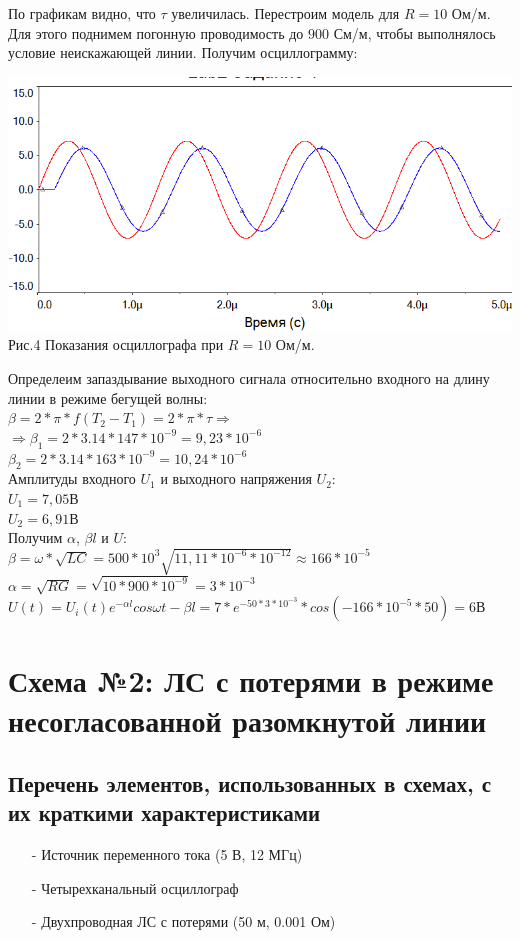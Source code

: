\documentclass[11pt]{article}
\begin{document}
По графикам видно, что $\tau$ увеличилась. Перестроим модель для $R = 10$ Ом/м.
Для этого поднимем погонную проводимость до $900$ См/м, чтобы выполнялось условие неискажающей линии.
Получим осциллограмму:
\begin{center}
\includegraphics[width=1\linewidth]{img/firstosc3.png}
    Рис.4 Показания осциллографа при  $R = 10$ Ом/м.
\end{center}

Определеим запаздывание выходного сигнала относительно входного на длину линии в режиме бегущей волны:\\
$\beta = 2*\pi*f(T_2-T_1) = 2*\pi*\tau \Rightarrow$ \\ 
$\Rightarrow \beta_1 = 2 * 3.14 * 147 * 10^{-9} = 9,23 * 10^{-6}$\\ 
$\beta_2 = 2 * 3.14 * 163 * 10^{-9} = 10,24 * 10^{-6}$\\ 

Амплитуды входного $U_1$ и выходного напряжения $U_2$:\\
$U_1 = 7,05$В\\
$U_2 = 6,91$В\\
Получим $\alpha$, $\beta l$ и $U$:\\
$\beta = \omega * \sqrt{LC} = 500 * 10^3\sqrt{11,11*10^{-6}* 10^{-12}} \approx 166* 10^{-5}$\\
$\alpha = \sqrt{RG} = \sqrt{10 * 900 * 10^{-9}} = 3 * 10^{-3}$\\
$U(t) = U_i(t)e^{-\alpha l}cos\omega t - \beta l = 7 * e^{-50 * 3 * 10^{-3}} * cos(-166 * 10^{-5} * 50) = 6$В
\newpage
\section{ Схема №2: ЛС с потерями в режиме несогласованной разомкнутой линии}
\subsection{Перечень элементов, использованных в схемах, с
их краткими характеристиками}
\begin{itemize}
    \item[-] Источник переменного тока (5 В, 12 МГц)
    \item[-] Четырехканальный осциллограф
    \item[-] Двухпроводная ЛС с потерями (50 м, 0.001 Ом)
\end{itemize}
\end{document}
